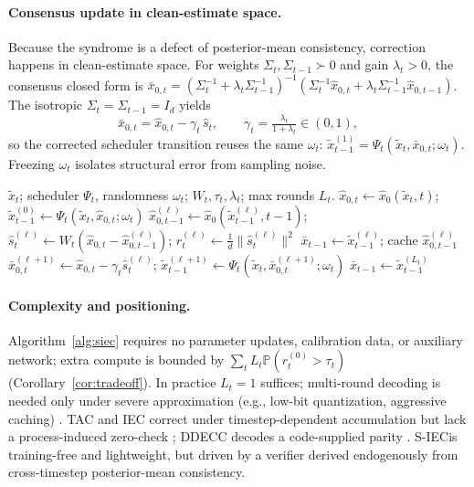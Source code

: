 \documentclass{article}
\theoremstyle{plain}
\theoremstyle{definition}
\theoremstyle{remark}
\newcommand{\SIEC}{\texorpdfstring{S\mbox{-}IEC\xspace}{S-IEC }}
\begin{document}
\paragraph{Consensus update in clean-estimate space.}
Because the syndrome is a defect of posterior-mean consistency, correction
happens in clean-estimate space. For weights \(\Sigma_t,\Sigma_{t-1}\succ 0\)
and gain \(\lambda_t>0\), the consensus closed form is \(\bar x_{0,t} =
(\Sigma_t^{-1} + \lambda_t\Sigma_{t-1}^{-1})^{-1}(\Sigma_t^{-1}\hat x_{0,t} +
\lambda_t\Sigma_{t-1}^{-1}\hat x_{0,t-1})\). The isotropic
\(\Sigma_t=\Sigma_{t-1}=I_d\) yields
\begin{equation}
\bar x_{0,t} = \hat x_{0,t} - \gamma_t\, \hat s_t,
\qquad
\gamma_t = \tfrac{\lambda_t}{1+\lambda_t} \in (0,1),
\label{eq:iso_consensus}
\end{equation}
so the corrected scheduler transition reuses the same \(\omega_t\):
\(\tilde x_{t-1}^{(1)} = \Psi_t(\tilde x_t, \bar x_{0,t}; \omega_t)\).
Freezing \(\omega_t\) isolates structural error from sampling noise.

\begin{algorithm}[t]
\caption{\SIEC reverse step at time \(t\)}
\label{alg:siec}
\begin{algorithmic}[1]
\Require \(\tilde x_t\); scheduler \(\Psi_t\), randomness \(\omega_t\);
  \(W_t, \tau_t, \lambda_t\); max rounds \(L_t\).
\State \(\hat x_{0,t} \gets \hat x_0(\tilde x_t,t)\);
       \(\tilde x_{t-1}^{(0)} \gets \Psi_t(\tilde x_t,\hat x_{0,t};\omega_t)\)
  \State \(\hat x_{0,t-1}^{(\ell)} \gets \hat x_0(\tilde x_{t-1}^{(\ell)},t-1)\);
         \(\hat s_t^{(\ell)} \gets W_t(\hat x_{0,t} - \hat x_{0,t-1}^{(\ell)})\);
         \(r_t^{(\ell)} \gets \tfrac1d\|\hat s_t^{(\ell)}\|^2\)
     \Return \(\bar x_{t-1} \gets \tilde x_{t-1}^{(\ell)}\);
              cache \(\hat x_{0,t-1}^{(\ell)}\) 
  \EndIf
  \State \(\bar x_{0,t}^{(\ell+1)} \gets \hat x_{0,t} - \gamma_t \hat s_t^{(\ell)}\);
         \(\tilde x_{t-1}^{(\ell+1)} \gets \Psi_t(\tilde x_t, \bar x_{0,t}^{(\ell+1)};\omega_t)\)
\EndFor
\State \Return \(\bar x_{t-1} \gets \tilde x_{t-1}^{(L_t)}\)
\end{algorithmic}
\end{algorithm}

\paragraph{Complexity and positioning.}
Algorithm~\ref{alg:siec} requires no parameter updates, calibration data,
or auxiliary network; extra compute is bounded by
\(\sum_t L_t\mathbb{P}(r_t^{(0)}>\tau_t)\) (Corollary~\ref{cor:tradeoff}).
In practice \(L_t=1\) suffices; multi-round decoding is needed only under
severe approximation (e.g., low-bit quantization, aggressive caching)
\citep{shang2023ptqdm,ma2024deepcache}. TAC and IEC correct under
timestep-dependent accumulation but lack a process-induced zero-check
\citep{yao2024tac,zhong2026iec}; DDECC decodes a code-supplied parity
\citep{choukroun2023ddecc}. \SIEC is training-free and lightweight, but
driven by a verifier derived endogenously from cross-timestep posterior-mean
consistency.
\end{document}
